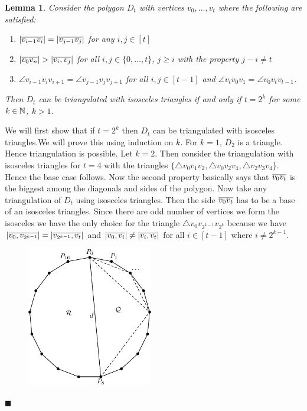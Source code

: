 \documentclass[a4paper, 11pt]{article}
\newtheorem{lemma}{Lemma}
\renewenvironment{proof}{\noindent{\it \textbf{Proof:}}\hspace*{1em}}{\hfill $\blacksquare$\bigskip\\}
\begin{document}
{\begin{itemize}[label=$\bullet$]
\begin{itemize}
	\begin{lemma}\label{p5lm1}
		 Consider the  polygon $D_t$ with vertices $v_0,\dots, v_t$ where the following are satisfied:\begin{enumerate}
			\item $|\overline{v_{i-1}v_i}|=|\overline{v_{j-1}v_j}|$ for any $i,j\in [t]$ 
			\item $|\ov{v_0v_n}|>|\ov{v_i,v_j}|$ for all $i,j\in\{0,\dots, t\}$, $j\geq i$ with the property $j-i\neq t$ 
			\item  $\angle v_{i-1}v_iv_{i+1}=\angle v_{j-1}v_jv_{j+1}$ for all $i,j\in[t-1]$ and $\angle v_tv_0v_1=\angle v_0v_{t}v_{t-1}$.
		\end{enumerate} Then $D_t$ can be triangulated with isosceles triangles if and only if $t=2^k$ for some $k\in\mathbb{N}$, $k>1$.
	\end{lemma}
\begin{proof}
	
	We will first show that if $t=2^k$ then $D_t$ can be triangulated with isosceles triangles.We will prove this using induction on $k$. For $k=1$, $D_2$ is a triangle. Hence triangulation is possible. Let $k=2$. Then  consider the triangulation with isosceles triangles for $t=4$ with the triangles $\{\triangle v_0v_1v_2, \triangle v_0v_2v_4, \triangle v_2v_3v_4\}$. Hence the base case follows. Now the  second property basically says that $\overline{v_0v_t}$ is the biggest among the diagonals and sides of the polygon. Now take any triangulation of $D_t$ using isosceles triangles. Then the side $\overline{v_0v_t}$ has to be a base of an isosceles triangles. Since there are odd number of vertices we form the isosceles we have the only choice for the  triangle $\triangle v_0v_{2^{k-1}}v_{2^k} $ because we have $|\overline{v_0,v_{2^{k-1}}}|= |\overline{v_{2^{k-1}},v_t}|$ and $|\overline{v_0,v_i}|\neq |\overline{v_i,v_t}|$ for all $i\in[t-1]$ where $i\neq 2^{k-1}$. 
	
	\begin{figure}[h]
		\centering
		\includegraphics[width=5.5cm]{workspace.pdf}
	\end{figure}


\end{proof}
\end{itemize}
\end{itemize}}
\end{document}
